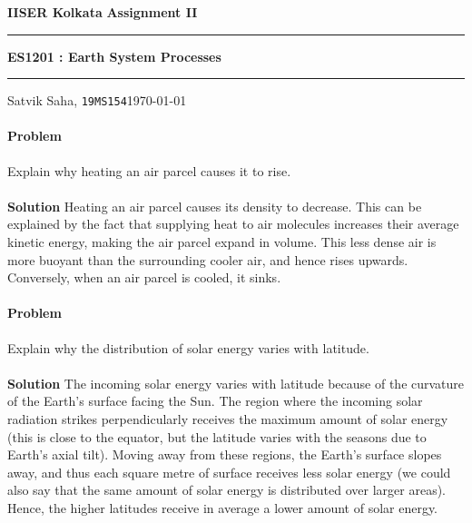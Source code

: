 \documentclass[10pt]{article}
\newcounter{prob}
\def\problem{\stepcounter{prob}\paragraph{Problem \arabic{prob}}}
\def\solution{\\\\\textbf{Solution }}
\begin{document}
        \par\textbf{IISER Kolkata} \hfill \textbf{Assignment II}
        \vspace{3pt}
        \hrule
        \vspace{3pt}
        \begin{center}
                \LARGE{\textbf{ES1201 : Earth System Processes}}
        \end{center}
        \vspace{3pt}
        \hrule
        \vspace{3pt}
        Satvik Saha, \texttt{19MS154}\hfill\today
        \vspace{20pt}

        \problem Explain why heating an air parcel causes it to rise.
        \solution Heating an air parcel causes its density to decrease. This can be explained by the fact that supplying heat to air molecules
        increases their average kinetic energy, making the air parcel expand in volume. This less dense air is more buoyant than the surrounding
        cooler air, and hence rises upwards. Conversely, when an air parcel is cooled, it sinks.

        \problem Explain why the distribution of solar energy varies with latitude.
        \solution The incoming solar energy varies with latitude because of the curvature of the Earth's surface facing the Sun.
        The region where the incoming solar radiation strikes perpendicularly receives the maximum amount of solar energy (this is close to the equator,
        but the latitude varies with the seasons due to Earth's axial tilt).
        Moving away from these regions, the Earth's surface slopes away, and thus each square metre of surface receives less solar energy
        (we could also say that the same amount of solar energy is distributed over larger areas).
        Hence, the higher latitudes receive in average a lower amount of solar energy.
\end{document}
